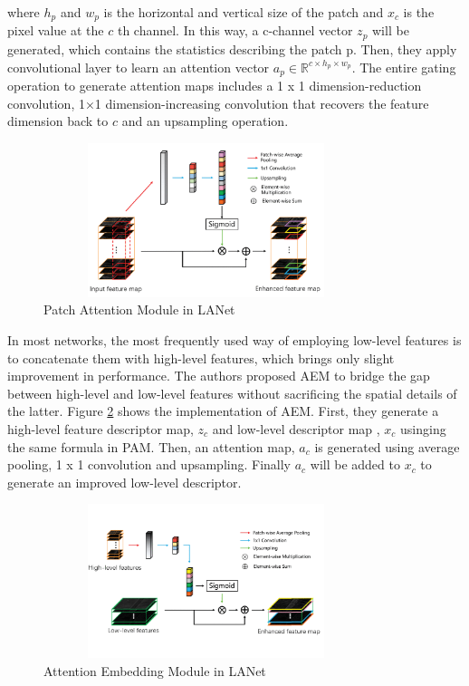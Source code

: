 where $h_p$ and $w_p$ is the horizontal and vertical size of the patch and $x_c$ is the pixel value at the $c$ th channel. In this way, a c-channel vector $z_p$ will be generated, which contains the statistics describing the patch p. Then, they apply convolutional layer to learn an attention vector $a_p \in \mathbb{R}^{c \times h_p \times w_p}$. The entire gating operation to generate attention maps includes a 1 x 1 dimension-reduction convolution, 1×1 dimension-increasing convolution that recovers the feature dimension back to $c$ and an upsampling operation.
\begin{figure}[ht]
\includegraphics[width=9.5cm, height=4.5cm]{images/pam.png}
\centering
\caption{Patch Attention Module in LANet}
\label{fig:pam}
\end{figure}
\FloatBarrier

In most networks, the most frequently used way of employing low-level features is to concatenate them with high-level features, which brings only slight improvement in performance. The authors proposed AEM to bridge the gap between high-level and low-level features without sacrificing the spatial details of the latter. Figure \ref{fig:aem} shows the implementation of AEM. First, they generate a high-level feature descriptor map, $z_c$ and low-level descriptor map , $x_c$ usinging the same formula in PAM. Then, an attention map, $a_c$ is generated using average pooling, 1 x 1 convolution and upsampling. Finally $a_c$ will be added to $x_c$ to generate an improved low-level descriptor.  
\begin{figure}[ht]
\includegraphics[width=9.5cm, height=4.5cm]{images/aem.png}
\centering
\caption{Attention Embedding Module in LANet}
\label{fig:aem}
\end{figure}
\FloatBarrier


